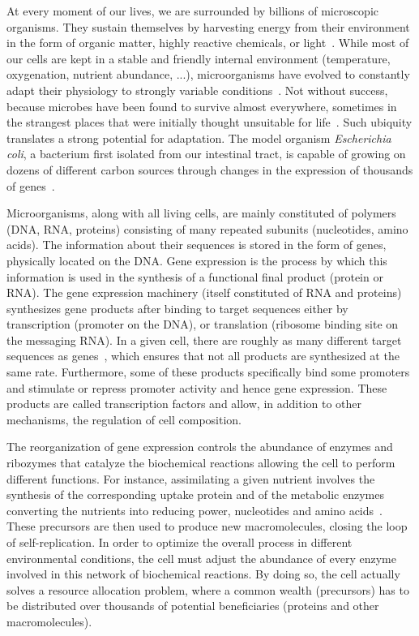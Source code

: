 At every moment of our lives, we are surrounded by billions of microscopic organisms.
They sustain themselves by harvesting energy from their environment in the form of organic matter, highly reactive chemicals, or light~\cite{madigan_biology_2006,schaechter_microbe_2006}.
While most of our cells are kept in a stable and friendly internal environment (temperature, oxygenation, nutrient abundance, ...), microorganisms have evolved to constantly adapt their physiology to strongly variable conditions~\cite{mcarthur_microbial_2006,menge_nitrogen_2012,hobbie_microbes_2013,
savageau_escherichia_1983,savageau_demand_1998,blount_unexhausted_2015,vanelsas_survival_2011}.
Not without success, because microbes have been found to survive almost everywhere, sometimes in the strangest places that were initially thought unsuitable for life~\cite{rothschild_life_2001,nicholson_transcriptomic_2012,madigan_biology_2006,schaechter_microbe_2006}.
Such ubiquity translates a strong potential for adaptation.
The model organism \textit{Escherichia coli}, a bacterium first isolated from our intestinal tract, is capable of growing on dozens of different carbon sources through changes in the expression of thousands of genes~\cite{zimmer_microcosm:_2009}.

Microorganisms, along with all living cells, are mainly constituted of polymers (DNA, RNA, proteins) consisting of many repeated subunits (nucleotides, amino acids).
The information about their sequences is stored in the form of genes, physically located on the DNA.
Gene expression is the process by which this information is used in the synthesis of a functional final product (protein or RNA).
The gene expression machinery (itself constituted of RNA and proteins) synthesizes gene products after binding to target sequences either by transcription (promoter on the DNA), or translation (ribosome binding site on the messaging RNA).
In a given cell, there are roughly as many different target sequences as genes~\cite{keseler_ecocyc_2013}, which ensures that not all products are synthesized at the same rate.
Furthermore, some of these products specifically bind some promoters and stimulate or repress promoter activity and hence gene expression.
These products are called transcription factors and allow, in addition to other mechanisms, the regulation of cell composition.

The reorganization of gene expression controls the abundance of enzymes and ribozymes that catalyze the biochemical reactions allowing the cell to perform different functions.
For instance, assimilating a given nutrient involves the synthesis of the corresponding uptake protein and of the metabolic enzymes converting the nutrients into reducing power, nucleotides and amino acids~\cite{schaechter_microbe_2006}.
These precursors are then used to produce new macromolecules, closing the loop of self-replication.
In order to optimize the overall process in different environmental conditions, the cell must adjust the abundance of every enzyme involved in this network of biochemical reactions.
By doing so, the cell actually solves a resource allocation problem, where a common wealth (precursors) has to be distributed over thousands of potential beneficiaries (proteins and other macromolecules).

